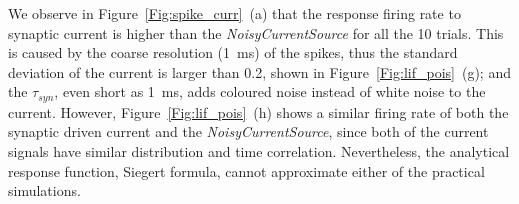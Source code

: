 	We observe in Figure~\ref{Fig:spike_curr}~(a) that the response firing rate to synaptic current is higher than the \textit{NoisyCurrentSource} for all the 10 trials.
	This is caused by the coarse resolution (1~ms) of the spikes, thus the standard deviation of the current is larger than 0.2, shown in Figure~\ref{Fig:lif_pois}~(g);
	and the $\tau_{syn}$, even short as 1~ms, adds coloured noise instead of white noise to the current.
	However, Figure~\ref{Fig:lif_pois}~(h) shows a similar firing rate of both the synaptic driven current and the \textit{NoisyCurrentSource}, since both of the current signals have similar distribution and time correlation.
	Nevertheless, the analytical response function, Siegert formula, cannot approximate either of the practical simulations.
	
	

		
